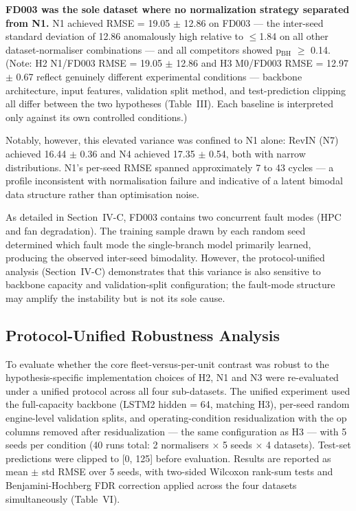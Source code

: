 \documentclass[review,12pt]{elsarticle}
\begin{document}
\textbf{FD003 was the sole dataset where no normalization strategy separated from N1.} N1 achieved RMSE = 19.05 $\pm$ 12.86 on FD003 --- the inter-seed standard deviation of 12.86 anomalously high relative to $\leq$1.84 on all other dataset-normaliser combinations --- and all competitors showed p$_\text{BH}$ $\geq$ 0.14. (Note: H2 N1/FD003 RMSE = 19.05 $\pm$ 12.86 and H3 M0/FD003 RMSE = 12.97 $\pm$ 0.67 reflect genuinely different experimental conditions --- backbone architecture, input features, validation split method, and test-prediction clipping all differ between the two hypotheses (Table~III). Each baseline is interpreted only against its own controlled conditions.)

Notably, however, this elevated variance was confined to N1 alone: RevIN (N7) achieved 16.44 $\pm$ 0.36 and N4 achieved 17.35 $\pm$ 0.54, both with narrow distributions. N1's per-seed RMSE spanned approximately 7 to 43 cycles --- a profile inconsistent with normalisation failure and indicative of a latent bimodal data structure rather than optimisation noise.

As detailed in Section~IV-C, FD003 contains two concurrent fault modes (HPC and fan degradation). The training sample drawn by each random seed determined which fault mode the single-branch model primarily learned, producing the observed inter-seed bimodality. However, the protocol-unified analysis (Section~IV-C) demonstrates that this variance is also sensitive to backbone capacity and validation-split configuration; the fault-mode structure may amplify the instability but is not its sole cause.

\subsection{Protocol-Unified Robustness Analysis}
\label{subsec:norm_robust}

To evaluate whether the core fleet-versus-per-unit contrast was robust to the hypothesis-specific implementation choices of H2, N1 and N3 were re-evaluated under a unified protocol across all four sub-datasets. The unified experiment used the full-capacity backbone (LSTM2 hidden = 64, matching H3), per-seed random engine-level validation splits, and operating-condition residualization with the op columns removed after residualization --- the same configuration as H3 --- with 5 seeds per condition (40 runs total: 2 normalisers $\times$ 5 seeds $\times$ 4 datasets). Test-set predictions were clipped to [0, 125] before evaluation. Results are reported as mean $\pm$ std RMSE over 5 seeds, with two-sided Wilcoxon rank-sum tests and Benjamini-Hochberg FDR correction applied across the four datasets simultaneously (Table~VI).
\end{document}
